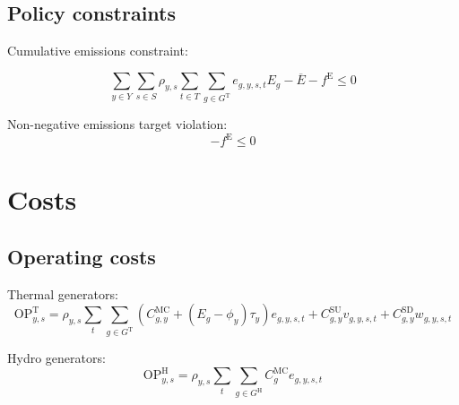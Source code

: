 \documentclass{article}
\newcommand{\sGeneratorsExistingThermal}{G^{\mathrm{E,T}}}
\newcommand{\sGeneratorsCandidate}{G^{\mathrm{C}}}
\newcommand{\sGeneratorsThermal}{G^{\mathrm{T}}}
\newcommand{\sGeneratorsHydro}{G^{\mathrm{H}}}
\newcommand{\sYears}{Y}
\newcommand{\sScenarios}{S}
\newcommand{\sIntervals}{T}
\newcommand{\iGenerator}{g}
\newcommand{\iYear}{y}
\newcommand{\iScenario}{s}
\newcommand{\iInterval}{t}
\newcommand{\cOperatingCostThermal}[1][\iYear,\iScenario]{\mathrm{OP}^{\mathrm{T}}_{#1}}
\newcommand{\cOperatingCostHydro}[1][\iYear,\iScenario]{\mathrm{OP}^{\mathrm{H}}_{#1}}
\newcommand{\cScenarioDuration}[1][\iYear,\iScenario]{\rho_{#1}}
\newcommand{\cMarginalCost}[1][\iGenerator,\iYear]{C^{\mathrm{MC}}_{#1}}
\newcommand{\cStartupCost}[1][\iGenerator,\iYear]{C^{\mathrm{SU}}_{#1}}
\newcommand{\cShutdownCost}[1][\iGenerator,\iYear]{C^{\mathrm{SD}}_{#1}}
\newcommand{\cEmissionsIntensity}[1][\iGenerator]{E_{#1}}
\newcommand{\cEmmissionsCumulativeTarget}{\overline{E}}
\newcommand{\cSchemeRevenueCumulativeTarget}{\overline{R}}
\newcommand{\vBaseline}[1][\iYear]{\phi_{#1}}
\newcommand{\vPermitPrice}[1][\iYear]{\tau_{#1}}
\newcommand{\vEnergy}[1][\iGenerator,\iYear,\iScenario,\iInterval]{e_{#1}}
\newcommand{\vStartupIndicator}[1][\iGenerator,\iYear,\iScenario,\iInterval]{v_{#1}}
\newcommand{\vShutdownIndicator}[1][\iGenerator,\iYear,\iScenario,\iInterval]{w_{#1}}
\newcommand{\vEmissionsTargetViolation}{f^{\mathrm{E}}}
\begin{document}
\subsection{Policy constraints}

Cumulative emissions constraint:

\begin{equation}
\sum\limits_{\iYear \in \sYears} \sum\limits_{\iScenario \in \sScenarios} \cScenarioDuration \sum\limits_{\iInterval \in \sIntervals} \sum\limits_{\iGenerator \in \sGeneratorsThermal} \vEnergy \cEmissionsIntensity - \cEmmissionsCumulativeTarget - \vEmissionsTargetViolation \leq 0
\label{eqn: cumulative emissions target}
\end{equation}

Non-negative emissions target violation:
\begin{equation}
	-\vEmissionsTargetViolation \leq 0
	\label{eqn: non negative emissions target violation}
\end{equation}

%

\section{Costs}
\subsection{Operating costs}
Thermal generators:
\begin{equation}
	\cOperatingCostThermal = \cScenarioDuration\sum\limits_{\iInterval}\sum\limits_{\iGenerator \in \sGeneratorsThermal} (\cMarginalCost + (\cEmissionsIntensity - \vBaseline)\vPermitPrice)\vEnergy + \cStartupCost \vStartupIndicator + \cShutdownCost \vShutdownIndicator
\end{equation}

Hydro generators:
\begin{equation}
	\cOperatingCostHydro = \cScenarioDuration\sum\limits_{\iInterval}\sum\limits_{\iGenerator \in \sGeneratorsHydro}\cMarginalCost[\iGenerator] \vEnergy
\end{equation}
\end{document}
